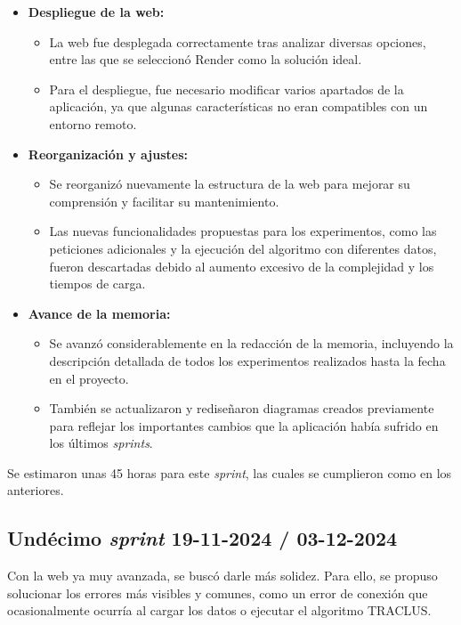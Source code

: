 \begin{itemize}
    \item \textbf{Despliegue de la web:}
    \begin{itemize}
        \item La web fue desplegada correctamente tras analizar diversas opciones, entre las que se seleccionó Render como la solución ideal.
        \item Para el despliegue, fue necesario modificar varios apartados de la aplicación, ya que algunas características no eran compatibles con un entorno remoto.
    \end{itemize}

    \item \textbf{Reorganización y ajustes:}
    \begin{itemize}
        \item Se reorganizó nuevamente la estructura de la web para mejorar su comprensión y facilitar su mantenimiento.
        \item Las nuevas funcionalidades propuestas para los experimentos, como las peticiones adicionales y la ejecución del algoritmo con diferentes datos, fueron descartadas debido al aumento excesivo de la complejidad y los tiempos de carga.
    \end{itemize}

    \item \textbf{Avance de la memoria:}
    \begin{itemize}
        \item Se avanzó considerablemente en la redacción de la memoria, incluyendo la descripción detallada de todos los experimentos realizados hasta la fecha en el proyecto.
        \item También se actualizaron y rediseñaron diagramas creados previamente para reflejar los importantes cambios que la aplicación había sufrido en los últimos \textit{sprints}.
    \end{itemize}
\end{itemize}

Se estimaron unas 45 horas para este \textit{sprint}, las cuales se cumplieron como en los anteriores.

\subsection{Undécimo \textit{sprint} 19-11-2024 / 03-12-2024}

Con la web ya muy avanzada, se buscó darle más solidez. Para ello, se propuso solucionar los errores más visibles y comunes, como un error de conexión que ocasionalmente ocurría al cargar los datos o ejecutar el algoritmo TRACLUS.

